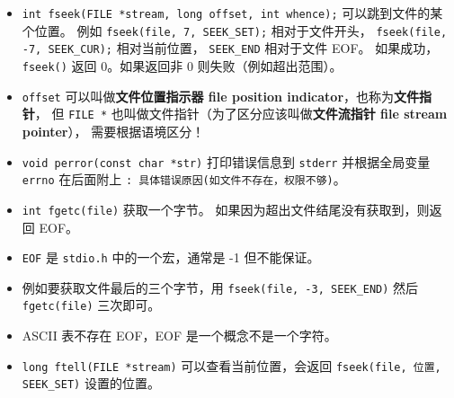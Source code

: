 \begin{itemize}
\begin{lstlisting}[language=cpp]
    // Step 4: Move the file pointer to a specific location, modify contents
    fseek(file, 7, SEEK_SET); // Jump to the 8th character
    fputs("Universe", file);  // Overwrite "World" with "Universe"

    // Step 5: Jump to the beginning again to read the updated content
    fseek(file, 0, SEEK_SET);
    printf("\nUpdated file contents:\n");
    while (fgets(buffer, sizeof(buffer), file) != NULL) {
        printf("%s", buffer);
    }

    // Close the file
    fclose(file);
    return 0;
}
\end{lstlisting}
\item \verb`int fseek(FILE *stream, long offset, int whence);` 可以跳到文件的某个位置。 例如 \verb`fseek(file, 7, SEEK_SET);` 相对于文件开头， \verb`fseek(file, -7, SEEK_CUR);` 相对当前位置， \verb`SEEK_END` 相对于文件 EOF。 如果成功，\verb`fseek()` 返回 0。如果返回非 0 则失败（例如超出范围）。
\item \verb`offset` 可以叫做\textbf{文件位置指示器 file position indicator}，也称为\textbf{文件指针}， 但 \verb`FILE *` 也叫做文件指针（为了区分应该叫做\textbf{文件流指针 file stream pointer}）， 需要根据语境区分！
\item \verb`void perror(const char *str)` 打印错误信息到 \verb`stderr` 并根据全局变量 \verb`errno` 在后面附上 \verb`: 具体错误原因(如文件不存在，权限不够)`。
\item \verb`int fgetc(file)` 获取一个字节。 如果因为超出文件结尾没有获取到，则返回 EOF。
\item \verb`EOF` 是 \verb`stdio.h` 中的一个宏，通常是 -1 但不能保证。
\item 例如要获取文件最后的三个字节，用 \verb`fseek(file, -3, SEEK_END)` 然后 \verb`fgetc(file)` 三次即可。
\item ASCII 表不存在 EOF，EOF 是一个概念不是一个字符。
\item \verb`long ftell(FILE *stream)` 可以查看当前位置，会返回 \verb`fseek(file, 位置, SEEK_SET)` 设置的位置。
\end{itemize}

